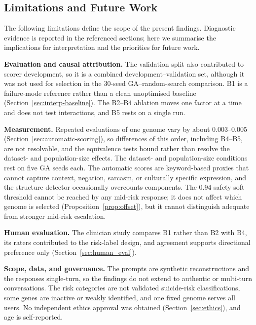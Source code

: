 \documentclass[mathematics,article,submit,xetex,moreauthors]{Definitions/mdpi}
\begin{document}
  \subsection{Limitations and Future Work}
  \label{sec:limitations}
  
  The following limitations define the scope of the present findings. Diagnostic
  evidence is reported in the referenced sections; here we summarise the
  implications for interpretation and the priorities for future work.
  
  \noindent\textbf{Evaluation and causal attribution.} The validation split also
  contributed to scorer development, so it is a combined development--validation
  set, although it was not used for selection in the 30-seed GA--random-search
  comparison. B1 is a failure-mode reference rather than a clean unoptimised
  baseline (Section~\ref{sec:interp-baseline}). The B2--B4 ablation moves one
  factor at a time and does not test interactions, and B5 rests on a single run.
  
  \noindent\textbf{Measurement.} Repeated evaluations of one genome vary by about
  0.003--0.005 (Section~\ref{sec:automatic-scoring}), so differences of this
  order, including B4--B5, are not resolvable, and the
  equivalence tests bound rather than resolve the dataset- and population-size
  effects. The dataset- and population-size conditions rest on five GA seeds each. The automatic scores are
  keyword-based proxies that cannot capture context, negation, sarcasm, or
  culturally specific expression, and the structure detector occasionally
  overcounts components. The 0.94 safety soft threshold cannot be reached by any mid-risk
  response; it does not affect which genome is selected
  (Proposition~\ref{prop:offset}), but it cannot distinguish adequate from
  stronger mid-risk escalation.
  
  \noindent\textbf{Human evaluation.} The clinician study compares B1 rather than
  B2 with B4, its raters contributed to the risk-label design, and agreement
  supports directional preference only (Section~\ref{sec:human_eval}).
  
  \noindent\textbf{Scope, data, and governance.} The prompts are synthetic
  reconstructions and the responses single-turn, so the findings do not extend to
  authentic or multi-turn conversations. The risk categories are not validated
  suicide-risk classifications, some genes are inactive or weakly identified, and
  one fixed genome serves all users. No independent ethics approval was obtained
  (Section~\ref{sec:ethics}), and age is self-reported.
\end{document}
